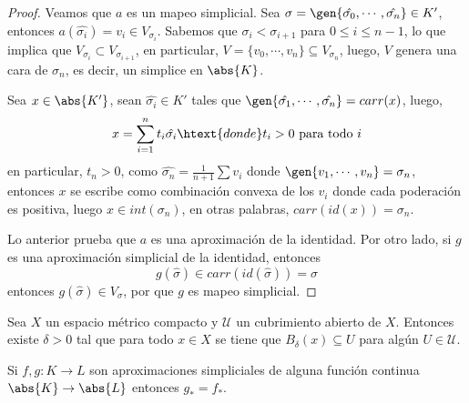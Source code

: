 \documentclass{article}
\begin{document}
\begin{proof}
    Veamos que $a$ es un mapeo simplicial. Sea $\sigma
    =\gen{\hat{\sigma_{0}},\cdots,\hat{\sigma_{n}}}\in K'$, entonces 
    $a(\hat{\sigma_{i}})=v_{i}\in V_{\sigma_{i}}$. Sabemos que $\sigma_{i}<\sigma_{i+1}$
    para $0\leq i\leq n-1$, lo que implica que $V_{\sigma_{i}}\subset V_{\sigma_{i+1}}$, en 
    particular, $V=\{v_{0},\cdots,v_{n}\}\subseteq V_{\sigma_{n}}$, luego, $V$ genera una cara de 
    $\sigma_{n}$, es decir, un simplice en $\abs{K}$.

    \vspace{2mm}
    Sea $x\in\abs{K'}$, sean $\hat{\sigma_{i}}\in K'$ tales que 
    $\gen{\hat{\sigma_{1}},\cdots,\hat{\sigma_{n}}}=carr(x)$, luego,
    \begin{equation*}
        x=\sum_{i=1}^{n}t_{i}\hat{\sigma_{i}}\htext{donde}t_{i}>0\text{ para todo }i
    \end{equation*}
    en particular, $t_{n}>0$, como $\hat{\sigma_{n}}=\frac{1}{n+1}\sum v_{i}$ donde 
    $\gen{v_{1},\cdots,v_{n}}=\sigma_{n}$, entonces $x$ se escribe como combinación convexa de los
    $v_{i}$ donde cada poderación es positiva, luego $x\in int(\sigma_{n})$, en otras palabras,
    $carr(id(x))=\sigma_{n}$.

    \vspace{2mm}
    Lo anterior prueba que $a$ es una aproximación de la identidad. Por otro lado, si $g$ es una
    aproximación simplicial de la identidad, entonces
    \begin{equation*}
        g(\hat{\sigma})\in carr(id(\hat{\sigma}))=\sigma
    \end{equation*}
    entonces $g(\hat{\sigma})\in V_{\sigma}$, por que $g$ es mapeo simplicial.
\end{proof}

\begin{lema}
    Sea $X$ un espacio métrico compacto y $\mathcal{U}$ un cubrimiento abierto de $X$. Entonces 
    existe $\delta>0$ tal que para todo $x\in X$ se tiene que $B_{\delta}(x)\subseteq U$ para 
    algún $U\in\mathcal{U}$.
\end{lema}

\vspace{2mm}
\begin{lema}
    Si $f,g:K\to L$ son aproximaciones simpliciales de alguna función continua $\abs{K}\to\abs{L}$
    entonces $g_{*}=f_{*}$.
\end{lema}
\end{document}

